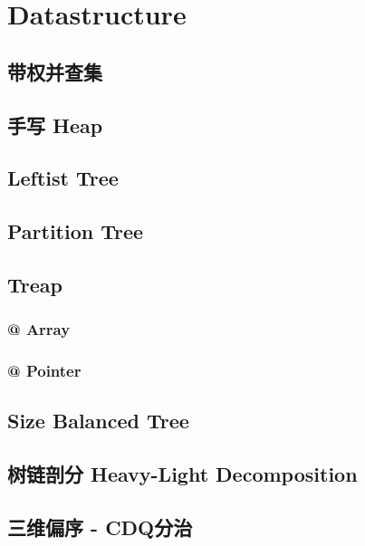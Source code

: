 \section{Datastructure}
	\subsection{带权并查集}
		
	\subsection{手写 Heap}
		
	\subsection{Leftist Tree}
		
	\subsection{Partition Tree}
		
	\subsection{Treap}
		\subsubsection{@ Array}
			
		\subsubsection{@ Pointer}
			
	\subsection{Size Balanced Tree}
		
	\subsection{树链剖分 Heavy-Light Decomposition}
		
	\subsection{三维偏序 - CDQ分治}
		
